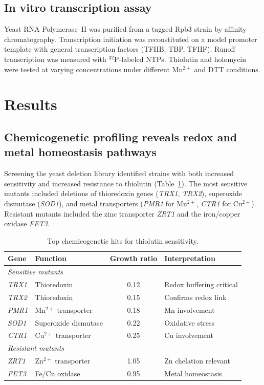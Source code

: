 \documentclass[11pt]{article}
\begin{document}
\subsection{In vitro transcription assay}

Yeast RNA Polymerase~II was purified from a tagged Rpb3 strain by affinity chromatography. Transcription initiation was reconstituted on a model promoter template with general transcription factors (TFIIB, TBP, TFIIF). Runoff transcription was measured with $^{32}$P-labeled NTPs. Thiolutin and holomycin were tested at varying concentrations under different Mn$^{2+}$ and DTT conditions.

\section{Results}

\subsection{Chemicogenetic profiling reveals redox and metal homeostasis pathways}

Screening the yeast deletion library identified strains with both increased sensitivity and increased resistance to thiolutin (Table~\ref{tab:screen}). The most sensitive mutants included deletions of thioredoxin genes (\textit{TRX1}, \textit{TRX2}), superoxide dismutase (\textit{SOD1}), and metal transporters (\textit{PMR1} for Mn$^{2+}$, \textit{CTR1} for Cu$^{2+}$). Resistant mutants included the zinc transporter \textit{ZRT1} and the iron/copper oxidase \textit{FET3}.

\begin{table}[ht]
\centering
\caption{Top chemicogenetic hits for thiolutin sensitivity.}
\label{tab:screen}
\begin{tabular}{llcl}
\toprule
\textbf{Gene} & \textbf{Function} & \textbf{Growth ratio} & \textbf{Interpretation} \\
\midrule
\multicolumn{4}{l}{\textit{Sensitive mutants}} \\
\textit{TRX1} & Thioredoxin & 0.12 & Redox buffering critical \\
\textit{TRX2} & Thioredoxin & 0.15 & Confirms redox link \\
\textit{PMR1} & Mn$^{2+}$ transporter & 0.18 & Mn involvement \\
\textit{SOD1} & Superoxide dismutase & 0.22 & Oxidative stress \\
\textit{CTR1} & Cu$^{2+}$ transporter & 0.25 & Cu involvement \\
\midrule
\multicolumn{4}{l}{\textit{Resistant mutants}} \\
\textit{ZRT1} & Zn$^{2+}$ transporter & 1.05 & Zn chelation relevant \\
\textit{FET3} & Fe/Cu oxidase & 0.95 & Metal homeostasis \\
\bottomrule
\end{tabular}
\end{table}
\end{document}
